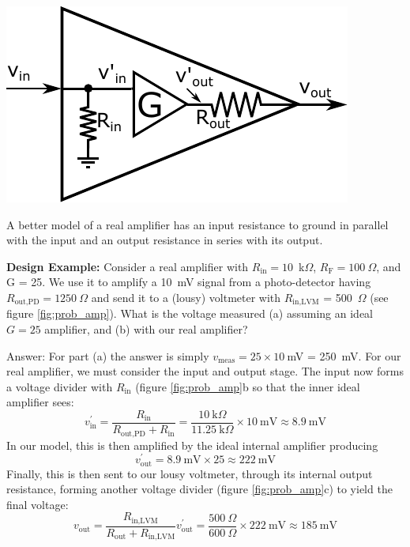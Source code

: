 \documentclass{tufte-book}
\begin{document}
\begin{marginfigure}%
  \includegraphics[width=\linewidth]{RealAmplifier_int_out}
  \caption{A better model of a real amplifier has an input resistance to ground in parallel with the input and an output resistance in series with its output.}
  \label{fig:real_amp_int_out}
\end{marginfigure}

\noindent\textbf{Design Example:} Consider a real amplifier with $R_\text{in} = 10$~k$\Omega$, $R_\text{F} = 100~\Omega$, and G = 25. We use it to amplify a 10~mV signal from a photo-detector having $R_\text{out,PD} = 1250~\Omega$ and send it to a (lousy) voltmeter with $R_\text{in,LVM}$ = 500~$\Omega$ (see figure \ref{fig:prob_amp}). What is the voltage measured (a) assuming an ideal $G = 25$ amplifier, and (b) with our real amplifier?

\noindent Answer: For part (a) the answer is simply $v_\text{meas} = 25\times10~$mV = 250~mV. For our real amplifier, we must consider the input and output stage. The input now forms a voltage divider with $R_\text{in}$ (figure \ref{fig:prob_amp}b so that the inner ideal amplifier sees:
$$
v_\text{in}^\prime=\frac{R_\text{in}}{R_\text{out,PD} + R_\text{in}} = \frac{10~\text{k}\Omega}{11.25~\text{k}\Omega}\times10~\text{mV} \approx 8.9~\text{mV}
$$
In our model, this is then amplified by the ideal internal amplifier producing
$$
v_\text{out}^\prime = 8.9~\text{mV}\times 25 \approx 222~\text{mV}
$$
Finally, this is then sent to our lousy voltmeter, through its internal output resistance, forming another voltage divider (figure \ref{fig:prob_amp}c) to yield the final voltage:
$$
v_\text{out} = \frac{R_\text{in,LVM}}{R_\text{out} + R_\text{in,LVM}}v_\text{out}^\prime = \frac{500~\Omega}{600~\Omega}\times 222~\text{mV}\approx 185~\text{mV}
$$
\end{document}
